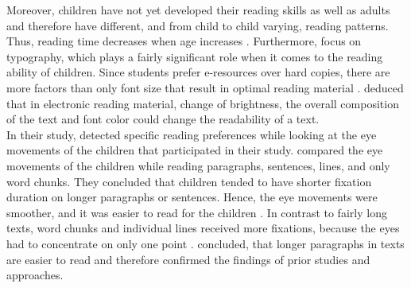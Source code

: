 Moreover, children have not yet developed their reading skills as well as adults and therefore have different, and from child to child varying, reading patterns. Thus, reading time decreases when age increases \autocite{sharmin2012effect, adattil2018effects}. Furthermore, \textcite{adattil2018effects} focus on typography, which plays a fairly significant role when it comes to the reading ability of children. Since students prefer e-resources over hard copies, there are more factors than only font size that result in optimal reading material \autocite{adattil2018effects}. \textcite{adattil2018effects} deduced that in electronic reading material, change of brightness, the overall composition of the text and font color could change the readability of a text.\\
In their study, \textcite{sharmin2012effect} detected specific reading preferences while looking at the eye movements of the children that participated in their study. \textcite{sharmin2012effect} compared the eye movements of the children while reading paragraphs, sentences, lines, and only word chunks. They concluded that children tended to have shorter fixation duration on longer paragraphs or sentences. Hence, the eye movements were smoother, and it was easier to read for the children \autocite{sharmin2012effect}. In contrast to fairly long texts, word chunks and individual lines received more fixations, because the eyes had to concentrate on only one point \autocite{sharmin2012effect}. \textcite{sharmin2012effect} concluded, that longer paragraphs in texts are easier to read and therefore confirmed the findings of prior studies and approaches.

